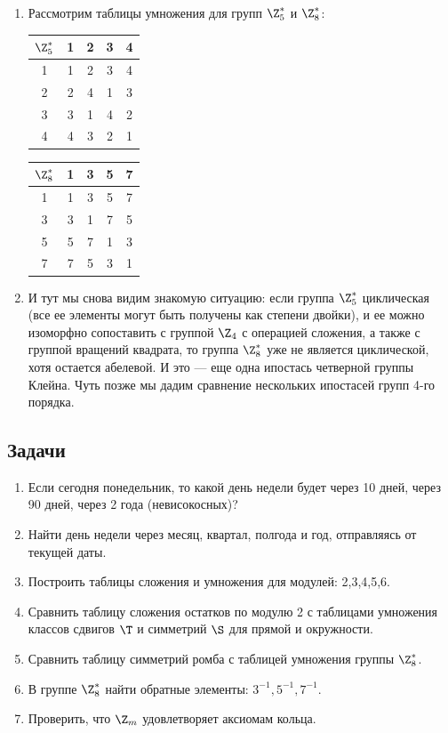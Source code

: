 \begin{enumerate}
\item Рассмотрим таблицы умножения для групп $\Z_5^*$ и $\Z_8^*$:
\begin{center}
\begin{tabular}{c||c|c|c|c|}
$\Z_5^*$  & 1 & 2 & 3 & 4 \\ \hline\hline
        1 & 1 & 2 & 3 & 4 \\ \hline
        2 & 2 & 4 & 1 & 3 \\ \hline
        3 & 3 & 1 & 4 & 2 \\ \hline
        4 & 4 & 3 & 2 & 1 \\ \hline
\end{tabular}
\qquad
\begin{tabular}{c||c|c|c|c|}
$\Z_8^*$  & 1 & 3 & 5 & 7 \\ \hline\hline
        1 & 1 & 3 & 5 & 7 \\ \hline
        3 & 3 & 1 & 7 & 5 \\ \hline
        5 & 5 & 7 & 1 & 3 \\ \hline
        7 & 7 & 5 & 3 & 1 \\ \hline
\end{tabular}
\end{center}
\item И тут мы снова видим знакомую ситуацию: если группа $\Z_5^*$ циклическая (все ее элементы могут быть получены как степени двойки), и ее можно изоморфно сопоставить с группой $\Z_4$ с операцией сложения, а также с группой вращений квадрата, то группа $\Z_8^*$ уже не является циклической, хотя остается абелевой. И это --- еще одна ипостась четверной группы Клейна. Чуть позже мы дадим сравнение нескольких ипостасей групп 4-го порядка.

\end{enumerate}



\subsection*{Задачи}
\begin{enumerate}
\item Если сегодня понедельник, то какой день недели будет через 10 дней, через 90 дней, через 2 года (невисокосных)?
\item Найти день недели через месяц, квартал, полгода и год, отправляясь от текущей даты.
\item Построить таблицы сложения и умножения для модулей: 2,3,4,5,6.
\item Сравнить таблицу сложения остатков по модулю 2 с таблицами умножения классов сдвигов $\T$ и симметрий $\S$ для прямой и окружности.
\item Сравнить таблицу симметрий ромба с таблицей умножения группы $\Z_8^*$.
\item В группе $\Z_8^*$ найти обратные элементы: $3^{-1}, 5^{-1}, 7^{-1}$.
\item Проверить, что $\Z_m$ удовлетворяет аксиомам кольца.
\end{enumerate}

